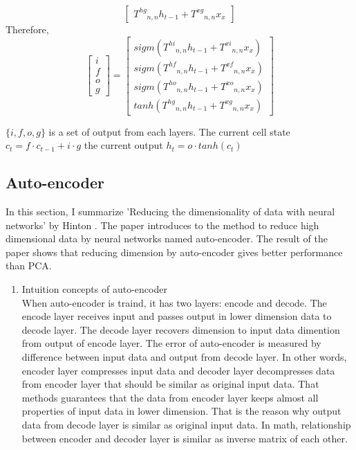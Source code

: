 \documentclass[draft,dvipsnames]{drexel-thesis}
\begin{document}
\begin{thesis}
\begin{enumerate}
\begin{enumerate}
\[\begin{bmatrix}
    {T^{hg}}_{n,n}h_{t-1} + {T^{xg}}_{n,n}x_{x}
\end{bmatrix}
\]
Therefore,\\
\[
\begin{bmatrix}
    i \\
    f \\
    o \\
    g
\end{bmatrix}
=
\begin{bmatrix}
    sigm({T^{hi}}_{n,n}h_{t-1} + {T^{xi}}_{n,n}x_{x}) \\
    sigm({T^{hf}}_{n,n}h_{t-1} + {T^{xf}}_{n,n}x_{x}) \\
    sigm({T^{ho}}_{n,n}h_{t-1} + {T^{xo}}_{n,n}x_{x}) \\
    tanh({T^{hg}}_{n,n}h_{t-1} + {T^{xg}}_{n,n}x_{x})
\end{bmatrix}
\]

$\{i, f, o, g\}$ is a set of output from each layers.
The current cell state $c_t = f \cdot c_{t-1} + i \cdot g$
the current output $h_t = o \cdot tanh(c_t)$

	\end{enumerate}
\end{enumerate}

\subsection{Auto-encoder}\label{subsec:AE}
In this section, I summarize 'Reducing the dimensionality of data with neural networks' by Hinton \cite{hinton2006reducing}. The paper introduces to the method to reduce high dimensional data by neural networks named auto-encoder. The result of the paper shows that reducing dimension by auto-encoder gives better performance than PCA. \\
\begin{enumerate}
\item Intuition concepts of auto-encoder\\
When auto-encoder is traind, it has two layers: encode and decode. The encode layer receives input and passes output in lower dimension data to decode layer. The decode layer recovers dimension to input data dimention from output of encode layer. The error of auto-encoder is measured by difference between input data and output from decode layer. In other words, encoder layer compresses input data and decoder layer decompresses data from encoder layer that should be similar as original input data. That methods guarantees that the data from encoder layer keeps almost all properties of input data in lower dimension. That is the reason why output data from decode layer is similar as original input data. In math, relationship between encoder and decoder layer is similar as inverse matrix of each other.


\end{enumerate}
\end{thesis}
\end{document}
